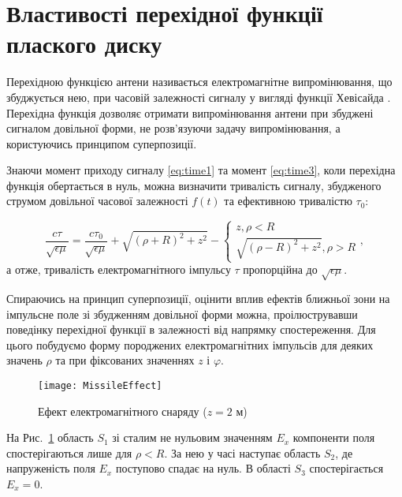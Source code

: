 \section{Властивості перехідної функції плаского диску}

Перехідною функцією антени називається електромагнітне випромінювання, що 
збуджується нею, при часовій залежності сигналу у вигляді функції Хевісайда
\cite{imp:Kharkevich1950}. Перехідна функція дозволяє отримати 
випромінювання антени при збуджені сигналом довільної форми, не 
розв'язуючи задачу випромінювання, а користуючись принципом суперпозиції.

Знаючи момент приходу сигналу \eqref{eq:time1} та момент \eqref{eq:time3},
коли перехідна функція обертається в нуль, можна визначити тривалість
сигналу, збудженого струмом довільної часової залежності $ f(t) $ та 
ефективною тривалістю $ \tau_0 $:

\begin{equation} \label{eq:e2h}
\frac{c \tau}{\sqrt{\epsilon \mu}} = \frac{c \tau_0}{\sqrt{\epsilon \mu}} + 
\sqrt{(\rho+R)^2 + z^2} - \begin{cases} z, \rho < R \\ 
\sqrt{(\rho-R)^2 + z^2}, \rho > R \end{cases},
\end{equation}
%
а отже, тривалість електромагнітного імпульсу $ \tau $ пропорційна до 
$ \sqrt{\epsilon \mu} $.

Спираючись на принцип суперпозиції, оцінити вплив ефектів ближньої зони на 
імпульсне поле зі збудженням довільної форми можна, проілюструвавши поведінку 
перехідної функції в залежності від напрямку спостереження. Для цього 
побудуємо форму породжених електромагнітних імпульсів для деяких значень 
$ \rho $ та при фіксованих значеннях $ z $ і $ \varphi $.
 
\begin{figure}[h] \begin{center}
\texttt{[image: MissileEffect]}
\caption{Ефект електромагнітного снаряду ($ z = 2 $ м)} \label{fig:emp_rho}
\end{center} \end{figure}

На Рис.~\ref{fig:emp_rho} область $ S_1 $ зі сталим не нульовим значенням 
$ E_x $ компоненти поля спостерігаються лише для $ \rho < R $. За нею у 
часі наступає область $ S_2 $, де напруженість поля $ E_x $ поступово спадає 
на нуль. В області $ S_3 $ спостерігається $ E_x = 0 $.

